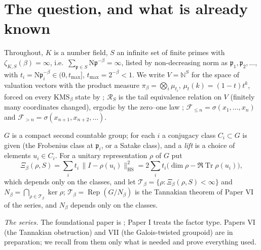\documentclass[11pt]{amsart}
\numberwithin{equation}{section}
\theoremstyle{definition}
\theoremstyle{remark}
\newcommand{\N}{\mathbb{N}}
\newcommand{\cF}{\mathcal{F}}
\newcommand{\cR}{\mathcal{R}}
\newcommand{\cT}{\mathcal{T}}
\newcommand{\pp}{\mathfrak{p}}
\newcommand{\Ns}{\mathrm{N}}
\newcommand{\Rep}{\operatorname{Rep}}
\newcommand{\Tr}{\operatorname{Tr}}
\newcommand{\HS}{\mathrm{HS}}
\begin{document}
\maketitle
\tableofcontents

\section{The question, and what is already known}

Throughout, $K$ is a number field, $S$ an infinite set of finite primes with
$\zeta_{K,S}(\beta)=\infty$, i.e.\ $\sum_{\pp\in S}\Ns\pp^{-\beta}=\infty$, listed by
non-decreasing norm as $\pp_1,\pp_2,\dots$, with $t_i=\Ns\pp_i^{-\beta}\in(0,t_{\max}]$,
$t_{\max}=2^{-\beta}<1$. We write
$V=\N^S$ for the space of valuation vectors with the product measure
$\pi_\beta=\bigotimes_i\mu_{t_i}$, $\mu_t(k)=(1-t)t^k$, forced on every $\mathrm{KMS}_\beta$
state by \cite[Lem.~2.10]{Main}; $\cR_S$ is the tail equivalence relation on $V$ (finitely
many coordinates changed), ergodic by the zero--one law \cite[Lem.~3.1]{Main};
$\cF_{\le n}=\sigma(x_1,\dots,x_n)$ and $\cF_{>n}=\sigma(x_{n+1},x_{n+2},\dots)$.

$G$ is a compact second countable group; for each $i$ a conjugacy class $C_i\subset G$ is
given (the Frobenius class at $\pp_i$, or a Satake class), and a \emph{lift} is a choice of
elements $u_i\in C_i$. For a unitary representation $\rho$ of $G$ put
\begin{equation}\label{eq:Xi}
\Xi_\beta(\rho,S)=\sum_i t_i\,\bigl\|I-\rho(u_i)\bigr\|_{\HS}^2
=2\sum_it_i\bigl(\dim\rho-\Re\Tr\rho(u_i)\bigr),
\end{equation}
which depends only on the classes, and let $\cT_\beta=\{\rho:\Xi_\beta(\rho,S)<\infty\}$ and
$N_\beta=\bigcap_{\rho\in\cT_\beta}\ker\rho$; $\cT_\beta=\Rep(G/N_\beta)$ is the Tannakian
theorem of Paper VI of the series, and $N_\beta$ depends only on the classes.

\emph{The series.} The foundational paper is \cite{Main}; Paper I \cite{SeriesI} treats the
factor type. Papers VI (the Tannakian obstruction) and VII (the Galois-twisted groupoid)
are in preparation; we recall from them only what is needed and prove everything used.
\end{document}
